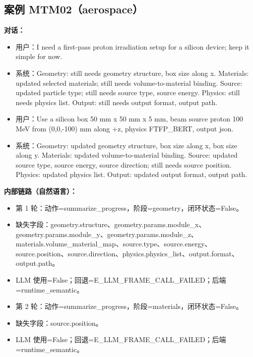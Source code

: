 \documentclass[11pt]{ctexart}
\begin{document}
\subsection{案例 MTM02（aerospace）}
\textbf{对话：}
\begin{itemize}
\item 用户：I need a first-pass proton irradiation setup for a silicon device; keep it simple for now.
\item 系统：Geometry: still needs geometry structure, box size along x. Materials: updated selected materials; still needs volume-to-material binding. Source: updated particle type; still needs source type, source energy. Physics: still needs physics list. Output: still needs output format, output path.
\item 用户：Use a silicon box 50 mm x 50 mm x 5 mm, beam source proton 100 MeV from (0,0,-100) mm along +z, physics FTFP\_BERT, output json.
\item 系统：Geometry: updated geometry structure, box size along x, box size along y. Materials: updated volume-to-material binding. Source: updated source type, source energy, source direction; still needs source position. Physics: updated physics list. Output: updated output format, output path.
\end{itemize}
\textbf{内部链路（自然语言）：}
\begin{itemize}
\item 第 1 轮：动作=summarize\_progress，阶段=geometry，闭环状态=False。
\item 缺失字段：geometry.structure、geometry.params.module\_x、geometry.params.module\_y、geometry.params.module\_z、materials.volume\_material\_map、source.type、source.energy、source.position、source.direction、physics.physics\_list、output.format、output.path。
\item LLM 使用=False；回退=E\_LLM\_FRAME\_CALL\_FAILED；后端=runtime\_semantic。
\item 第 2 轮：动作=summarize\_progress，阶段=materials，闭环状态=False。
\item 缺失字段：source.position。
\item LLM 使用=False；回退=E\_LLM\_FRAME\_CALL\_FAILED；后端=runtime\_semantic。
\end{itemize}
\end{document}
